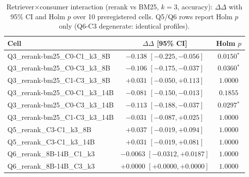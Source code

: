\begin{table}[t]
\centering
\caption{Retriever$\times$consumer interaction (rerank vs BM25, $k=3$, accuracy): $\Delta\Delta$ with 95\% CI and Holm $p$ over 10 preregistered cells. Q5/Q6 rows report Holm $p$ only (Q6-C3 degenerate: identical profiles).}
\label{tab:interaction}
\begin{tabular}{lcc}
\toprule
Cell & $\Delta\Delta$ [95\% CI] & Holm $p$ \\
\midrule
Q3\_rerank-bm25\_C0-C1\_k3\_8B & $-0.138$ $[-0.225,-0.056]$ & $0.0150$$^*$ \\
Q3\_rerank-bm25\_C0-C3\_k3\_8B & $-0.106$ $[-0.175,-0.037]$ & $0.0360$$^*$ \\
Q3\_rerank-bm25\_C1-C3\_k3\_8B & $+0.031$ $[-0.050,+0.113]$ & $1.0000$ \\
Q3\_rerank-bm25\_C0-C1\_k3\_14B & $-0.081$ $[-0.150,-0.013]$ & $0.1855$ \\
Q3\_rerank-bm25\_C0-C3\_k3\_14B & $-0.113$ $[-0.188,-0.037]$ & $0.0297$$^*$ \\
Q3\_rerank-bm25\_C1-C3\_k3\_14B & $-0.031$ $[-0.087,+0.025]$ & $1.0000$ \\
Q5\_rerank\_C3-C1\_k3\_8B & $+0.037$ $[-0.019,+0.094]$ & $1.0000$ \\
Q5\_rerank\_C3-C1\_k3\_14B & $+0.031$ $[-0.019,+0.081]$ & $1.0000$ \\
Q6\_rerank\_8B-14B\_C1\_k3 & $-0.0063$ $[-0.0312,+0.0187]$ & $1.0000$ \\
Q6\_rerank\_8B-14B\_C3\_k3 & $+0.0000$ $[+0.0000,+0.0000]$ & $1.0000$ \\
\bottomrule
\end{tabular}
\end{table}

